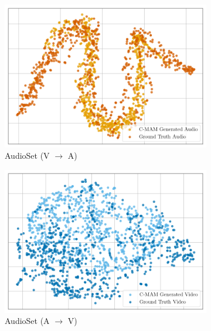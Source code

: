 \begin{figure}[!p]
    \centering
    \begin{subfigure}[b]{0.24\textwidth}
        \centering
        \includegraphics[width=\textwidth]{imgs/tsne/sns_audio_cmam_2.png}
        \caption*{AudioSet (V $\rightarrow$ A)}
    \end{subfigure}
    \begin{subfigure}[b]{0.24\textwidth}
        \centering
        \includegraphics[width=\textwidth]{imgs/tsne/sns_video_cmam_3.png}
        \caption*{AudioSet (A $\rightarrow$ V)}
    \end{subfigure}
    \begin{subfigure}[b]{0.24\textwidth}
        \centering

\end{subfigure}
\end{figure}
